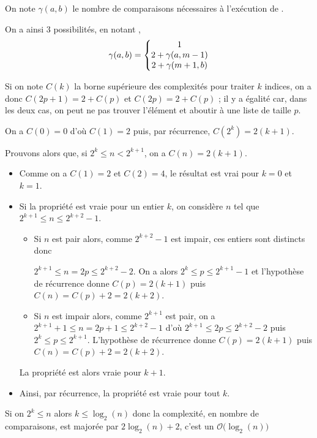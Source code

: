 On note $\gamma(a,b)$ le nombre de comparaisons nécessaires à l'exécution de .

On a ainsi 3 possibilités, en notant , 
\[ 
\gamma(a, b)= \left\{\begin{matrix} 1\cr  2 + \gamma(a, m-1)\\ 2 + \gamma(m+1, b) \end{matrix}\right.
\]

Si on note $C(k)$ la borne supérieure des complexités pour traiter $k$ indices,  on a donc $C(2p+1) = 2+C(p)$ et $C(2p) = 2 +C(p)$ ; il y a égalité car, dans les deux cas, on peut ne pas trouver l'élément et  aboutir à une liste de taille $p$.

On a $C(0)=0$ d'où $C(1)=2$  puis, par récurrence, $C(2^k) = 2(k+1)$.

\medskip

Prouvons alors que, si $2^{k} \le n < 2^{k+1}$, on a $C(n)=2(k+1)$.
\begin{itemize}
\item Comme on a $C(1)=2$ et $C(2)=4$, le résultat est vrai pour $k=0$ et $k=1$.

\item Si la propriété est vraie pour un entier $k$, on considère $n$ tel que $2^{k+1} \le n \le 2^{k+2}-1$.

\begin{itemize}
\item Si $n$ est pair alors, comme $2^{k+2}-1$ est impair, ces entiers sont distincts donc 

$2^{k+1} \le n =2p \le 2^{k+2}-2$. On a alors $2^{k} \le p \le 2^{k+1}-1$ et l'hypothèse de récurrence donne $C(p)=2(k+1)$ puis $C(n)=C(p)+2=2(k+2)$.

\item Si $n$ est impair alors, comme $2^{k+1}$ est pair, on a $2^{k+1}+1 \le n =2p+1 \le 2^{k+2}-1$ d'où  $2^{k+1} \le  2p \le 2^{k+2}-2$ puis $2^{k} \le p \le 2^{k+1}$. L'hypothèse de récurrence donne $C(p)=2(k+1)$ puis $C(n)=C(p)+2=2(k+2)$.
\end{itemize}
La propriété est alors vraie pour $k+1$.
\item Ainsi, par récurrence,  la propriété est vraie pour tout $k$.
\end{itemize}
Si on  $2^{k} \le n$ alors $k \le \log_2(n)$ donc la complexité, en nombre de comparaisons, est majorée par $2\log_2(n)+2$, c'est un ${\mathcal O}\bigl(\log_2(n)\bigr)$
\newpage
